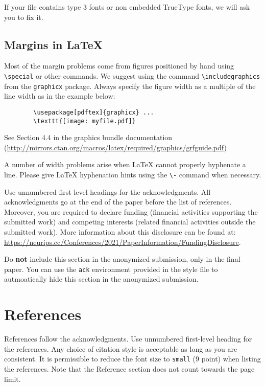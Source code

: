 \documentclass{article}
\begin{document}
	If your file contains type 3 fonts or non embedded TrueType fonts, we will ask
	you to fix it.
	
	\subsection{Margins in \LaTeX{}}
	
	Most of the margin problems come from figures positioned by hand using
	\verb+\special+ or other commands. We suggest using the command
	\verb+\includegraphics+ from the \verb+graphicx+ package. Always specify the
	figure width as a multiple of the line width as in the example below:
	\begin{verbatim}
		\usepackage[pdftex]{graphicx} ...
		\texttt{[image: myfile.pdf]}
	\end{verbatim}
	See Section 4.4 in the graphics bundle documentation
	(\url{http://mirrors.ctan.org/macros/latex/required/graphics/grfguide.pdf})
	
	A number of width problems arise when \LaTeX{} cannot properly hyphenate a
	line. Please give LaTeX hyphenation hints using the \verb+\-+ command when
	necessary.
	
	\begin{ack}
		Use unnumbered first level headings for the acknowledgments. All acknowledgments
		go at the end of the paper before the list of references. Moreover, you are required to declare
		funding (financial activities supporting the submitted work) and competing interests (related financial activities outside the submitted work).
		More information about this disclosure can be found at: \url{https://neurips.cc/Conferences/2021/PaperInformation/FundingDisclosure}.
		
		Do {\bf not} include this section in the anonymized submission, only in the final paper. You can use the \texttt{ack} environment provided in the style file to autmoatically hide this section in the anonymized submission.
	\end{ack}
	
	\section*{References}
	
	References follow the acknowledgments. Use unnumbered first-level heading for
	the references. Any choice of citation style is acceptable as long as you are
	consistent. It is permissible to reduce the font size to \verb+small+ (9 point)
	when listing the references.
	Note that the Reference section does not count towards the page limit.
	\medskip
	
\end{document}
